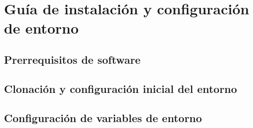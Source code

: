 \chapter{Gu\'ia de instalaci\'on y configuraci\'on de entorno}
\section{Prerrequisitos de software}
\section{Clonaci\'on y configuraci\'on inicial del entorno}
\section{Configuraci\'on de variables de entorno}